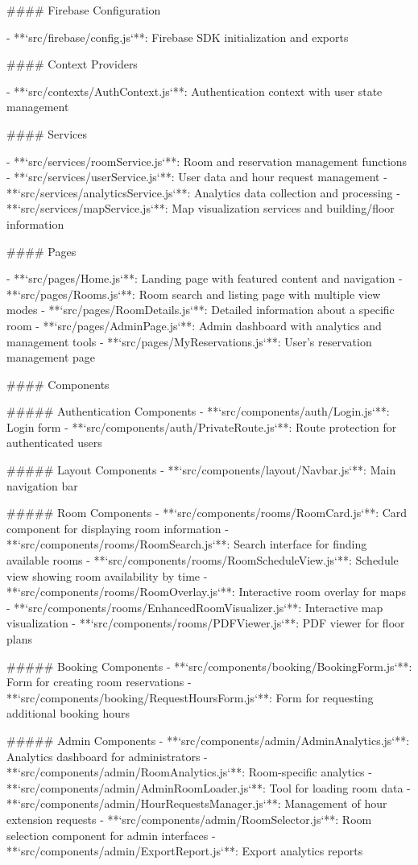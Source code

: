 #### Firebase Configuration

- **`src/firebase/config.js`**: Firebase SDK initialization and exports

#### Context Providers

- **`src/contexts/AuthContext.js`**: Authentication context with user state management

#### Services

- **`src/services/roomService.js`**: Room and reservation management functions
- **`src/services/userService.js`**: User data and hour request management
- **`src/services/analyticsService.js`**: Analytics data collection and processing
- **`src/services/mapService.js`**: Map visualization services and building/floor information

#### Pages

- **`src/pages/Home.js`**: Landing page with featured content and navigation
- **`src/pages/Rooms.js`**: Room search and listing page with multiple view modes
- **`src/pages/RoomDetails.js`**: Detailed information about a specific room
- **`src/pages/AdminPage.js`**: Admin dashboard with analytics and management tools
- **`src/pages/MyReservations.js`**: User's reservation management page

#### Components

##### Authentication Components
- **`src/components/auth/Login.js`**: Login form
- **`src/components/auth/PrivateRoute.js`**: Route protection for authenticated users

##### Layout Components
- **`src/components/layout/Navbar.js`**: Main navigation bar

##### Room Components
- **`src/components/rooms/RoomCard.js`**: Card component for displaying room information
- **`src/components/rooms/RoomSearch.js`**: Search interface for finding available rooms
- **`src/components/rooms/RoomScheduleView.js`**: Schedule view showing room availability by time
- **`src/components/rooms/RoomOverlay.js`**: Interactive room overlay for maps
- **`src/components/rooms/EnhancedRoomVisualizer.js`**: Interactive map visualization
- **`src/components/rooms/PDFViewer.js`**: PDF viewer for floor plans

##### Booking Components
- **`src/components/booking/BookingForm.js`**: Form for creating room reservations
- **`src/components/booking/RequestHoursForm.js`**: Form for requesting additional booking hours

##### Admin Components
- **`src/components/admin/AdminAnalytics.js`**: Analytics dashboard for administrators
- **`src/components/admin/RoomAnalytics.js`**: Room-specific analytics
- **`src/components/admin/AdminRoomLoader.js`**: Tool for loading room data
- **`src/components/admin/HourRequestsManager.js`**: Management of hour extension requests
- **`src/components/admin/RoomSelector.js`**: Room selection component for admin interfaces
- **`src/components/admin/ExportReport.js`**: Export analytics reports

